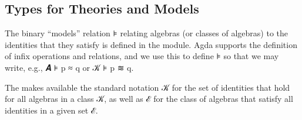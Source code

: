 \documentclass[a4paper,UKenglish,cleveref,autoref,thm-restate]{lipics-v2021}
\begin{document}
\subsection{Types for Theories and Models}\label{ssec:types-for-theories-and-models}

The binary ``models'' relation \aof ⊧ relating algebras (or classes of algebras) to the identities that they satisfy is defined in the \ualibModelTheory module.  Agda supports the definition of infix operations and relations, and we use this to define \aof ⊧ so that we may write, e.g., \ab 𝑨 \aof ⊧ \ab p \aof ≈ \ab q or \ab 𝒦 \aof ⊧ \ab p \aof ≋ \ab q.
\ccpad
\begin{code}%

\end{code}
\ccpad

The \agdaualib makes available the standard notation  \ab 𝒦 for the set of identities that hold for all algebras in a class \ab 𝒦, as well as  \ab ℰ for the class of algebras that satisfy all identities in a given set \ab ℰ.
\ccpad
\begin{code}%
  
\end{code}
\end{document}

